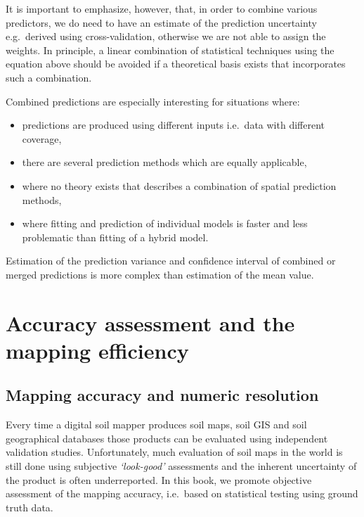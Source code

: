 \documentclass[graybox,natbib,nospthms,UStrade]{svmono}
\begin{document}
It is important to emphasize, however, that, in order to combine various
predictors, we do need to have an estimate of the prediction uncertainty
e.g.~derived using cross-validation, otherwise we are not able to assign
the weights. In principle, a linear combination of statistical techniques
using the equation above should be avoided if a theoretical basis exists
that incorporates such a combination.

Combined predictions are especially interesting for situations where:

\begin{itemize}
\item
  predictions are produced using different inputs i.e.~data with
  different coverage,
\item
  there are several prediction methods which are equally applicable,
\item
  where no theory exists that describes a combination of spatial
  prediction methods,
\item
  where fitting and prediction of individual models is faster and less
  problematic than fitting of a hybrid model.
\end{itemize}

Estimation of the prediction variance and confidence interval of
combined or merged predictions is more complex than estimation of the
mean value.

\hypertarget{accuracy-assessment}{%
\section{Accuracy assessment and the mapping efficiency}\label{accuracy-assessment}}

\hypertarget{mapping-accuracy}{%
\subsection{Mapping accuracy and numeric resolution}\label{mapping-accuracy}}

Every time a digital soil mapper produces soil maps, soil GIS and soil
geographical databases those products can be evaluated using independent
validation studies. Unfortunately, much evaluation of soil maps in the
world is still done using subjective \emph{`look-good'} assessments and the
inherent uncertainty of the product is often underreported. In this book,
we promote objective assessment of the mapping accuracy, i.e.~based on
statistical testing using ground truth data.
\end{document}
